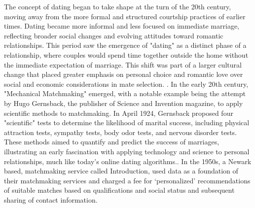 The concept of dating began to take shape at the turn of the 20th century, moving away from the more formal and structured courtship practices of earlier times. Dating became more informal and less focused on immediate marriage, reflecting broader social changes and evolving attitudes toward romantic relationships. This period saw the emergence of "dating" as a distinct phase of a relationship, where couples would spend time together outside the home without the immediate expectation of marriage. This shift was part of a larger cultural change that placed greater emphasis on personal choice and romantic love over social and economic considerations in mate selection. \cite{markarian_how_2017}. In the early 20th century, "Mechanical Matchmaking" emerged, with a notable example being the attempt by Hugo Gernsback, the publisher of Science and Invention magazine, to apply scientific methods to matchmaking. In April 1924, Gernsback proposed four "scientific" tests to determine the likelihood of marital success, including physical attraction tests, sympathy tests, body odor tests, and nervous disorder tests. These methods aimed to quantify and predict the success of marriages, illustrating an early fascination with applying technology and science to personal relationships, much like today's online dating algorithms.\cite{magazine_mechanical_nodate}. In the 1950s, a Newark based, matchmaking service called Introduction, used data as a foundation of their matchmaking services and charged a fee for ‘personalized’ recommendations of suitable matches based on qualifications and social status and subsequent sharing of contact information. \cite{newark_introduction_nodate}

